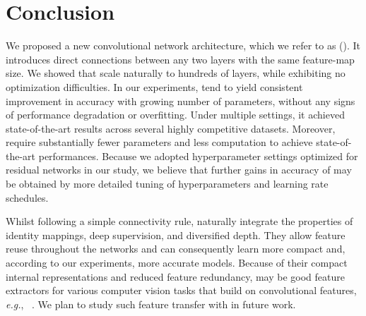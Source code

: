 \section{Conclusion}
We proposed a new convolutional network architecture, which we refer to as \methodnamecap{} (\methodnameshort{}). It introduces direct connections between any two layers with the same feature-map size.
We showed that \methodnameshorts{} scale naturally to hundreds of layers, while exhibiting no optimization difficulties. In our experiments, \methodnameshorts{} tend to yield consistent improvement in accuracy with growing number of parameters, without any signs of performance degradation or overfitting. Under multiple settings, it achieved state-of-the-art results across several highly competitive datasets. Moreover, \methodnameshorts{} require substantially fewer parameters and less computation to achieve state-of-the-art performances.
Because we adopted hyperparameter settings optimized for residual networks in our study, we believe that further gains in accuracy of \methodnameshorts{} may be obtained by more detailed tuning of hyperparameters and learning rate schedules. 

Whilst following a simple connectivity rule, \methodnameshorts{} naturally integrate the properties of identity mappings, deep supervision, and diversified depth. They allow feature reuse throughout the networks and can consequently learn more compact and, according to our experiments, more accurate models. Because of their compact internal representations and reduced feature redundancy, \methodnameshorts{} may be good feature extractors for various computer vision tasks that build on convolutional features, \emph{e.g.}, ~\cite{gardner2015deep,gatys2015neural}. We plan to study such feature transfer with \methodnameshorts{} in future work.


